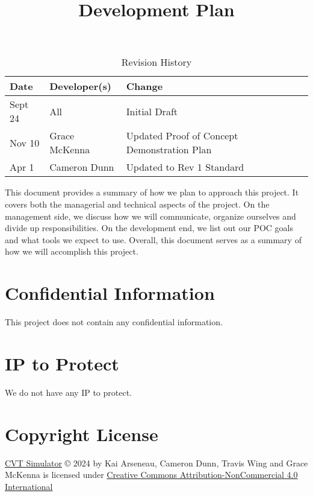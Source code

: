 \documentclass{article}
\title{Development Plan\\\progname}
\author{\authname}
\date{}
\begin{document}
\maketitle

\begin{table}[hp]
\caption{Revision History} \label{TblRevisionHistory}
\begin{tabularx}{\textwidth}{llX}
\toprule
\textbf{Date} & \textbf{Developer(s)} & \textbf{Change}\\
\midrule
Sept 24 & All & Initial Draft\\
Nov 10 & Grace McKenna & Updated Proof of Concept Demonstration Plan\\
Apr 1 & Cameron Dunn & Updated to Rev 1 Standard\\
\bottomrule
\end{tabularx}
\end{table}

\newpage{}

\noindent
This document provides a summary of how we plan to approach this project.
It covers both the managerial and technical aspects of the project.
On the management side, we discuss how we will communicate, organize ourselves and divide up responsibilities.
On the development end, we list out our POC goals and what tools we expect to use.
Overall, this document serves as a summary of how we will accomplish this project.

\section{Confidential Information}

This project does not contain any confidential information.

\section{IP to Protect}

We do not have any IP to protect.

\section{Copyright License}

\href{https://github.com/gr812b/CVT-Simulator}{CVT Simulator} © 2024 by 
Kai Arseneau, Cameron Dunn, Travis Wing and Grace McKenna is licensed under 
\href{https://creativecommons.org/licenses/by-nc/4.0/?ref=chooser-v1}{Creative Commons Attribution-NonCommercial 4.0 International}
\end{document}
